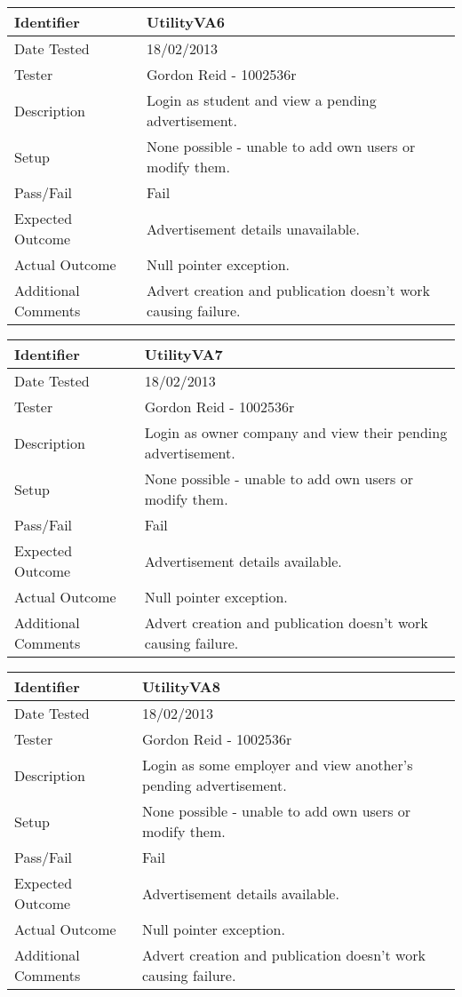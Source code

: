 \begin{tabularx}{\textwidth}{|T|L|}
\hline
Identifier & UtilityVA6\\
\hline
Date Tested & 18/02/2013\\
\hline
Tester & Gordon Reid - 1002536r\\
\hline
Description & Login as student and view a pending advertisement.\\
\hline
Setup & None possible - unable to add own users or modify them.\\
\hline
Pass/Fail & Fail\\
\hline
Expected Outcome & Advertisement details unavailable.\\
\hline
Actual Outcome & Null pointer exception.\\
\hline
Additional Comments & Advert creation and publication doesn't work causing
failure.\\
\hline
\end{tabularx}

\vspace{2em}

\begin{tabularx}{\textwidth}{|T|L|}
\hline
Identifier & UtilityVA7\\
\hline
Date Tested & 18/02/2013\\
\hline
Tester & Gordon Reid - 1002536r\\
\hline
Description & Login as owner company and view their pending advertisement.\\
\hline
Setup & None possible - unable to add own users or modify them.\\
\hline
Pass/Fail & Fail\\
\hline
Expected Outcome & Advertisement details available.\\
\hline
Actual Outcome & Null pointer exception.\\
\hline
Additional Comments & Advert creation and publication doesn't work causing
failure.\\
\hline
\end{tabularx}

\vspace{2em}

\begin{tabularx}{\textwidth}{|T|L|}
\hline
Identifier & UtilityVA8\\
\hline
Date Tested & 18/02/2013\\
\hline
Tester & Gordon Reid - 1002536r\\
\hline
Description & Login as some employer and view another's pending advertisement.\\
\hline
Setup & None possible - unable to add own users or modify them.\\
\hline
Pass/Fail & Fail\\
\hline
Expected Outcome & Advertisement details available.\\
\hline
Actual Outcome & Null pointer exception.\\
\hline
Additional Comments & Advert creation and publication doesn't work causing
failure.\\
\hline
\end{tabularx}